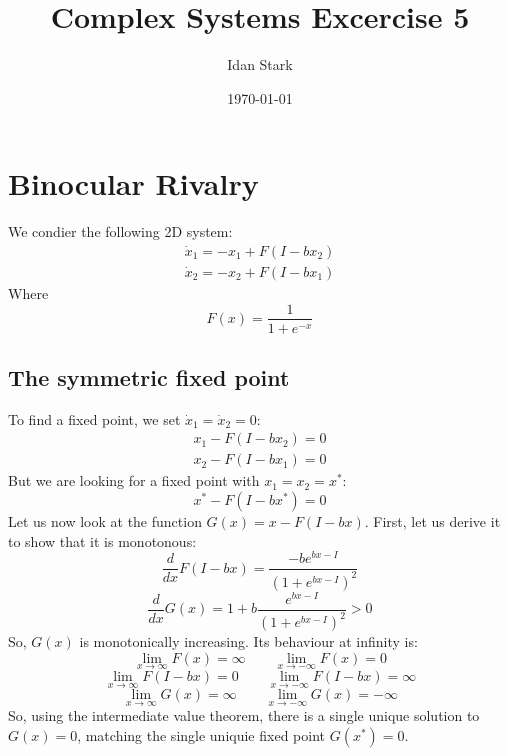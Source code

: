 \documentclass{article}
\title{Complex Systems Excercise 5}
\author{Idan Stark}
\date{\today}
\begin{document}
\maketitle

\section{Binocular Rivalry}
We condier the following 2D system:
\begin{equation}
\begin{gathered}
    \dot{x}_1 = - x_1 + F\left(I - bx_2\right)
    \\
    \dot{x}_2 = - x_2 + F\left(I - bx_1\right)
\end{gathered}
\end{equation}
Where
\begin{equation}
    F(x) = \frac{1}{1 + e^{-x}}
\end{equation}
\subsection{The symmetric fixed point}
To find a fixed point, we set $\dot{x}_1 = \dot{x}_2 = 0$:
\begin{equation}
\label{eq:system}
\begin{gathered}
    x_1 - F\left(I - bx_2\right) = 0
    \\
    x_2 - F\left(I - bx_1\right) = 0
\end{gathered}
\end{equation}
But we are looking for a fixed point with $x_1 = x_2 = x^*$:
\begin{equation}
    x^* - F\left(I - bx^*\right) = 0
\end{equation} 
Let us now look at the function $G(x) = x - F(I - bx)$. First, let us derive it to show that it is monotonous:
\begin{equation}
    \frac{d}{dx}F(I - bx) = \frac{-b e^{bx - I}}{(1 + e^{bx - I})^2}
\end{equation}
\begin{equation}
    \frac{d}{dx}G(x) = 1 + b \frac{e^{bx - I}}{(1 + e^{bx - I})^2} > 0
\end{equation}
So, $G(x)$ is monotonically increasing. Its behaviour at infinity is:
\begin{equation}
    \lim_{x\rightarrow\infty} F(x) = \infty
    \qquad
    \lim_{x\rightarrow-\infty} F(x) = 0
\end{equation}
\begin{equation}
    \lim_{x\rightarrow\infty} F(I - bx) = 0
    \qquad
    \lim_{x\rightarrow-\infty} F(I - bx) = \infty
\end{equation}
\begin{equation}
    \lim_{x \rightarrow \infty} G(x) = \infty
    \qquad
    \lim_{x\rightarrow-\infty} G(x) = -\infty
\end{equation}
So, using the intermediate value theorem, there is a single unique solution to $G(x) = 0$, matching the single uniquie fixed point $G(x^*) = 0$.
\end{document}
